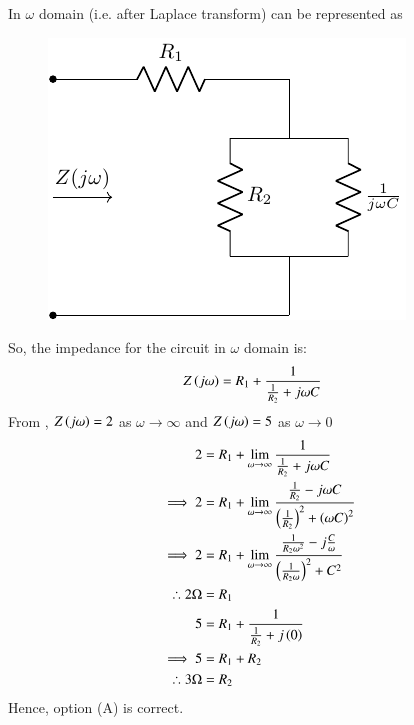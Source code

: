 \documentclass[journal,12pt,twocolumn]{IEEEtran}
\theoremstyle{remark}
\begin{document}
In $ \omega$ domain (i.e. after Laplace transform)  can be represented as 
\begin{figure}[h!]
    \includegraphics[width = 0.6\columnwidth]{figs/answer_fig.pdf}
    \caption{}
    \centering
    \label{fig: ece38_ans_1_fig}
\end{figure}
So, the impedance for the circuit in $ \omega$ domain is:
\begin{align}
Z\left(j \omega\right) &= R_1 +  \frac{1}{\frac{1}{R_2}+ j\omega C} \label{eq: ece38_1}
\end{align}
From , $ Z\left(j\omega\right)=2$ as $ \omega \to \infty$ and 
$ Z\left(j\omega\right)=5$ as $ \omega \to 0$
\begin{align}
2 &= R_1 + \lim_{\omega\to\infty}\frac{1}{\frac{1}{R_2}+ j\omega C}\\
\implies 2 &= R_1 + \lim_{\omega\to\infty}\frac{\frac{1}{R_2}- j \omega C}{\left(\frac{1}{R_2}\right)^2+ \left(\omega C\right)^2}\\
\implies 2 &= R_1 + \lim_{\omega\to\infty}\frac{\frac{1}{R_2 \omega^2}- j\frac{C}{\omega}}{\left(\frac{1}{R_2 \omega}\right)^2+ C^2}\\
\therefore 2\text{\ohm} &= R_1 \label{eq: ece_38_2}\\
5 &= R_1 + \frac{1}{\frac{1}{R_2}+j\left(0\right)}\\
\implies 5 &= R_1 + R_2\\
\therefore 3\text{\ohm} &= R_2
\end{align}
Hence, option (A) is correct.
\end{document}
